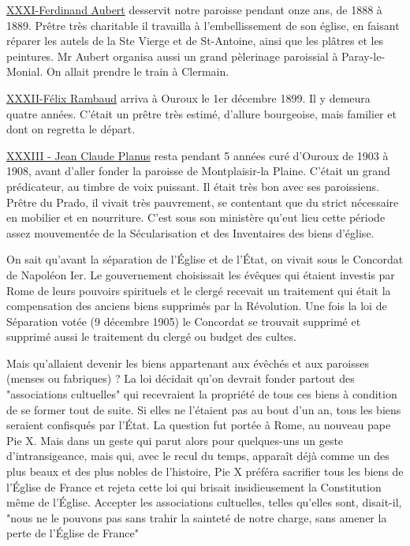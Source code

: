 \underline{XXXI-Ferdinand Aubert} desservit notre paroisse pendant onze ans, de 1888 à 1889. Prêtre très charitable il travailla à l'embellissement de son église, en faisant réparer les autels de la Ste Vierge et de St-Antoine, ainsi que les plâtres et les peintures. Mr Aubert organisa aussi un grand pèlerinage paroissial à Paray-le-Monial. On allait prendre le train à Clermain.

\underline{XXXII-Félix Rambaud} arriva à Ouroux le 1er décembre 1899. Il y demeura quatre années. C'était un prêtre très estimé, d'allure bourgeoise, mais familier et dont on regretta le départ.

\underline{XXXIII - Jean Claude Planus} resta pendant 5 années curé d'Ouroux de
1903 à 1908, avant d'aller fonder la paroisse de Montplaisir-la Plaine. C'était un grand prédicateur, au timbre de voix puissant. Il était très bon avec ses paroissiens. Prêtre du Prado, il vivait très
pauvrement, se contentant que du strict nécessaire en mobilier et
en nourriture. C'est sous son ministère qu'eut lieu cette période
assez mouvementée de la Sécularisation et des Inventaires des biens
d'église.

On sait qu'avant la séparation de l'Église et de l'État, on vivait sous le Concordat de Napoléon Ier. Le gouvernement choisissait
les évêques qui étaient investis par Rome de leurs pouvoirs spirituels et le clergé recevait un traitement qui était la compensation
des anciens biens supprimés par la Révolution. Une fois la loi de
Séparation votée (9 décembre 1905) le Concordat se trouvait supprimé et supprimé aussi le traitement du clergé ou budget des cultes.

Mais qu'allaient devenir les biens appartenant aux évêchés et
aux paroisses (menses ou fabriques) ? La loi décidait qu'on devrait
fonder partout des "associations cultuelles" qui recevraient la
propriété de tous ces biens à condition de se former tout de suite.
Si elles ne l'étaient pas au bout d'un an, tous les biens seraient
confisqués par l'État. La question fut portée à Rome, au nouveau pape Pie X. Mais dans un geste qui parut alors pour quelques-uns un
geste d'intransigeance, mais qui, avec le recul du temps, apparaît
déjà comme un des plus beaux et des plus nobles de l'histoire, Pie X
préféra sacrifier tous les biens de l'Église de France et rejeta
cette loi qui brisait insidieusement la Constitution même de l'Église. Accepter les associations cultuelles, telles qu'elles sont,
disait-il, "nous ne le pouvons pas sans trahir la sainteté de notre
charge, sans amener la perte de l'Église de France"

